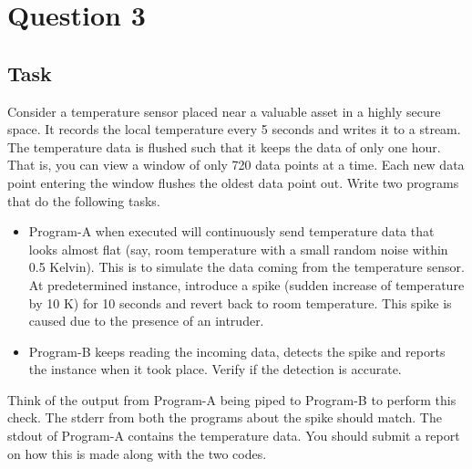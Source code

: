 \section{Question 3}

\subsection{Task}
Consider a temperature sensor placed near a valuable asset in a highly secure space. It records the local temperature every 5 seconds and writes it to a stream. The temperature data is flushed such that it keeps the data of only one hour. That is, you can view a window of only 720 data points at a time. Each new data point entering the window flushes the oldest data point out. Write two programs that do the following tasks.
\begin{itemize}
	\item Program-A when executed will continuously send temperature data that looks almost flat (say, room temperature with a small random noise within 0.5 Kelvin). This is to simulate the data coming from the temperature sensor. At predetermined instance, introduce a spike (sudden increase of temperature by 10 K) for 10 seconds and revert back to room temperature. This spike is caused due to the presence of an intruder.
	\item Program-B keeps reading the incoming data, detects the spike and reports the instance when it took place. Verify if the detection is accurate.
\end{itemize}
Think of the output from Program-A being piped to Program-B to perform this check. The stderr from both the programs about the spike should match. The stdout of Program-A contains the temperature data. You should submit a report on how this is made along with the two codes.

